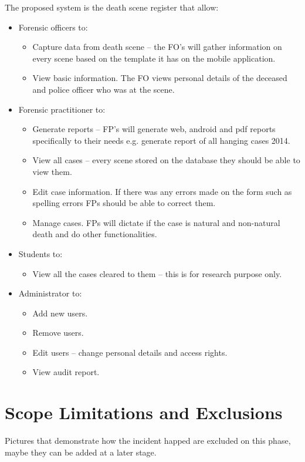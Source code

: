\documentclass[10pt,a4paper]{article}
\begin{document}
The proposed system is the death scene register that allow:
 \begin{itemize}
 \item Forensic officers to: 
	 \begin{itemize}
		\item Capture data from death scene – the FO’s will gather information on every scene based on the template it has on the mobile application.
		\item View basic information. The FO views personal details of the deceased and police officer who was at the scene.
	\end{itemize}
\item Forensic practitioner to:
	 \begin{itemize}
		\item Generate reports – FP’s will generate web, android and pdf reports specifically to their needs e.g. generate report of all hanging cases 2014.
		\item View all cases – every scene stored on the database they should be able to view them.
		\item Edit case information. If there was any errors made on the form such as spelling errors FPs should be able to correct them.
		\item Manage cases. FPs will dictate if the case is natural and non-natural death and do other functionalities.
	 \end{itemize}
\item Students to:
	 \begin{itemize}
		\item View all the cases cleared to them – this is for research purpose only.
	 \end{itemize}
\item Administrator to:
	 \begin{itemize}
		\item Add new users.
		\item Remove users.
		\item Edit users – change personal details and access rights.
		\item View audit report.
	 \end{itemize}
\end{itemize}

\section{Scope Limitations and Exclusions}
Pictures that demonstrate how the incident happed are excluded on this phase, maybe they can be added at a later stage.
\end{document}
